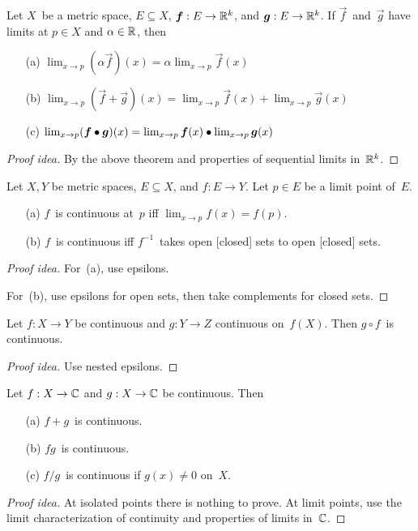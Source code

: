 \begin{thm}
Let \(X\)~be a metric space, \(E\subseteq X\), \(\boldsymbol{f}:E\to\mathbb{R}^k\), and \(\boldsymbol{g}:E\to\mathbb{R}^k\). If \(\vec{f}\)~and~\(\vec{g}\) have limits at \(p\in X\) and \(\alpha\in\mathbb{R}\), then
\begin{enumerate}[itemsep=0pt]
\item[(a)] \(\lim_{x\to p}(\alpha\vec{f})(x)=\alpha\lim_{x\to p}\vec{f}(x)\)
\item[(b)] \(\lim_{x\to p}(\vec{f}+\vec{g})(x)=\lim_{x\to p}\vec{f}(x)+\lim_{x\to p}\vec{g}(x)\)
\item[(c)] \(\lim_{x\to p}(\boldsymbol{f}\bullet\boldsymbol{g})(x)=\lim_{x\to p}\boldsymbol{f}(x)\bullet\lim_{x\to p}\boldsymbol{g}(x)\)
\end{enumerate}
\end{thm}
\begin{proof}[Proof idea]
By the above theorem and properties of sequential limits in~\(\mathbb{R}^k\).
\end{proof}

\begin{thm}
Let \(X,Y\) be metric spaces, \(E\subseteq X\), and \(f:E\to Y\). Let \(p\in E\) be a limit point of~\(E\).
\begin{enumerate}[itemsep=0pt]
\item[(a)] \(f\)~is continuous at~\(p\) iff \(\lim_{x\to p}f(x)=f(p)\).
\item[(b)] \(f\)~is continuous iff \(f^{-1}\)~takes open [closed] sets to open [closed] sets.
\end{enumerate}
\end{thm}
\begin{proof}[Proof idea]
For~(a), use epsilons.

For~(b), use epsilons for open sets, then take complements for closed sets.
\end{proof}

\begin{thm}
Let \(f:X\to Y\) be continuous and \(g:Y\to Z\) continuous on~\(f(X)\). Then \(g\circ f\)~is continuous.
\end{thm}
\begin{proof}[Proof idea]
Use nested epsilons.
\end{proof}

\begin{thm}
Let \(f:X\to\mathbb{C}\) and \(g:X\to\mathbb{C}\) be continuous. Then
\begin{enumerate}[itemsep=0pt]
\item[(a)] \(f+g\)~is continuous.
\item[(b)] \(fg\)~is continuous.
\item[(c)] \(f/g\)~is continuous if \(g(x)\ne0\) on~\(X\).
\end{enumerate}
\end{thm}
\begin{proof}[Proof idea]
At isolated points there is nothing to prove. At limit points, use the limit characterization of continuity and properties of limits in~\(\mathbb{C}\).
\end{proof}


